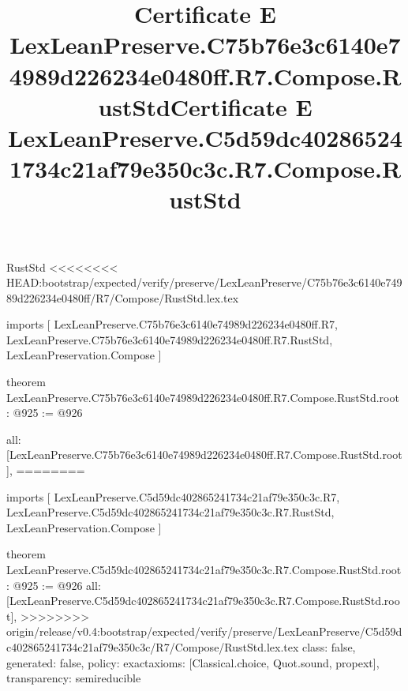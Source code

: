 \begin{lexlean}{RustStd}
<<<<<<<< HEAD:bootstrap/expected/verify/preserve/LexLeanPreserve/C75b76e3c6140e74989d226234e0480ff/R7/Compose/RustStd.lex.tex
\title{Certificate E LexLeanPreserve.C75b76e3c6140e74989d226234e0480ff.R7.Compose.RustStd}
\begin{coremodule}
imports [
  LexLeanPreserve.C75b76e3c6140e74989d226234e0480ff.R7,
  LexLeanPreserve.C75b76e3c6140e74989d226234e0480ff.R7.RustStd,
  LexLeanPreservation.Compose
]

theorem LexLeanPreserve.C75b76e3c6140e74989d226234e0480ff.R7.Compose.RustStd.root : @925 := @926 {
  all: [LexLeanPreserve.C75b76e3c6140e74989d226234e0480ff.R7.Compose.RustStd.root],
========
\title{Certificate E LexLeanPreserve.C5d59dc402865241734c21af79e350c3c.R7.Compose.RustStd}
\begin{coremodule}
imports [
  LexLeanPreserve.C5d59dc402865241734c21af79e350c3c.R7,
  LexLeanPreserve.C5d59dc402865241734c21af79e350c3c.R7.RustStd,
  LexLeanPreservation.Compose
]

theorem LexLeanPreserve.C5d59dc402865241734c21af79e350c3c.R7.Compose.RustStd.root : @925 := @926 {
  all: [LexLeanPreserve.C5d59dc402865241734c21af79e350c3c.R7.Compose.RustStd.root],
>>>>>>>> origin/release/v0.4:bootstrap/expected/verify/preserve/LexLeanPreserve/C5d59dc402865241734c21af79e350c3c/R7/Compose/RustStd.lex.tex
  class: false,
  generated: false,
  policy: exact{axioms: [Classical.choice, Quot.sound, propext]},
  transparency: semireducible
}


\end{coremodule}}
\end{coremodule}
\end{lexlean}
